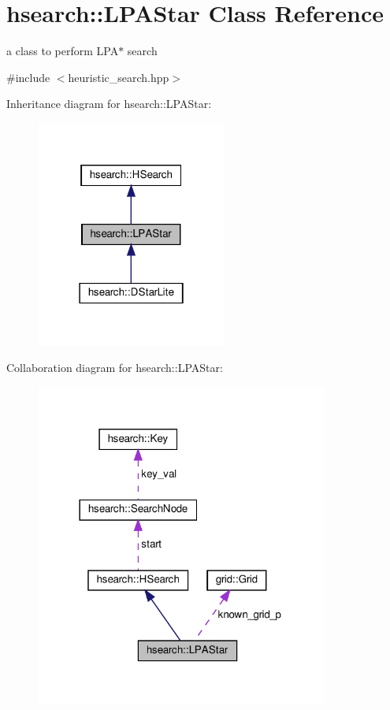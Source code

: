 \hypertarget{classhsearch_1_1LPAStar}{}\section{hsearch\+:\+:L\+P\+A\+Star Class Reference}
\label{classhsearch_1_1LPAStar}


a class to perform L\+P\+A$\ast$ search  




{\ttfamily \#include $<$heuristic\+\_\+search.\+hpp$>$}



Inheritance diagram for hsearch\+:\+:L\+P\+A\+Star\+:\nopagebreak
\begin{figure}[H]
\begin{center}
\leavevmode
\includegraphics[width=178pt]{d5/da1/classhsearch_1_1LPAStar__inherit__graph}
\end{center}
\end{figure}


Collaboration diagram for hsearch\+:\+:L\+P\+A\+Star\+:\nopagebreak
\begin{figure}[H]
\begin{center}
\leavevmode
\includegraphics[width=273pt]{dd/d4d/classhsearch_1_1LPAStar__coll__graph}
\end{center}
\end{figure}
